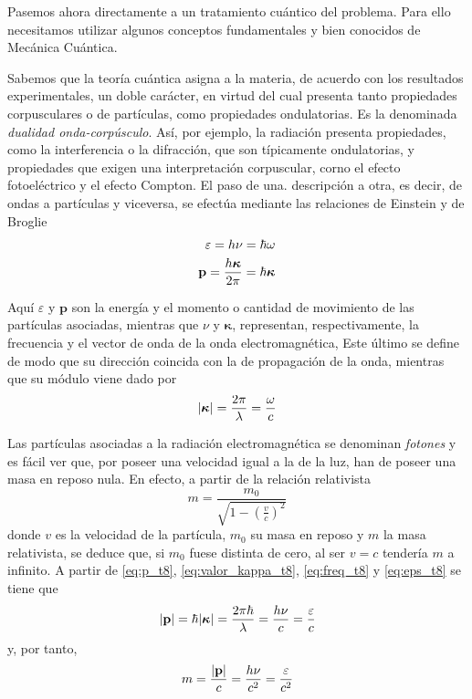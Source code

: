 Pasemos ahora directamente a un tratamiento cuántico del problema.
Para ello necesitamos utilizar algunos conceptos fundamentales y bien conocidos de Mecánica Cuántica.

Sabemos que la teoría cuántica asigna a la materia, de acuerdo con los resultados experimentales, un doble carácter, en virtud del cual presenta tanto propiedades corpusculares o de partículas, como propiedades ondulatorias.
Es la denominada \emph{dualidad onda-corpúsculo}.
Así, por ejemplo, la radiación presenta propiedades, como la interferencia o la difracción, que son típicamente ondulatorias, y propiedades que exigen una interpretación corpuscular, corno el efecto fotoeléctrico y el efecto Compton.
El paso de una. descripción a otra, es decir, de ondas a partículas y viceversa, se efectúa mediante las relaciones de Einstein y de Broglie
\begin{align}
	\varepsilon = h\nu = \hbar\omega \label{eq:eps_t8}\\
	\vb{p} = \frac{h\bm{\kappa}}{2\pi} = \hbar\bm{\kappa} \label{eq:p_t8}
\end{align}

Aquí $\varepsilon$ y $\mathbf{p}$ son la energía y el momento o cantidad de movimiento de las partículas asociadas, mientras que $\nu$ y $\bm{\kappa}$, representan, respectivamente, la frecuencia y el vector de onda de la onda electromagnética, Este último se define de modo que su dirección coincida con la de propagación de la onda, mientras que su módulo viene dado por
\begin{equation}\label{eq:valor_kappa_t8}
	\abs{\bm{\kappa}} = \frac{2\pi}{\lambda} = \frac{\omega}{c}
\end{equation}

Las partículas asociadas a la radiación electromagnética se denominan \emph{fotones} y es fácil ver que, por poseer una velocidad igual a la de la luz, han de poseer una masa en reposo nula.
En efecto, a partir de la relación relativista
\begin{equation}
	m = \frac{m_0}{\sqrt{1 - \left(\frac{v}{c}\right)^2}}
\end{equation}
donde $v$ es la velocidad de la partícula, $m_0$ su masa en reposo y $m$ la masa relativista, se deduce que, si $m_0$ fuese distinta de cero, al ser $v = c$ tendería $m$ a infinito.
A partir de \eqref{eq:p_t8}, \eqref{eq:valor_kappa_t8}, \eqref{eq:freq_t8} y \eqref{eq:eps_t8} se tiene que
\begin{equation}
	\abs{\vb{p}} = \hbar \abs{\bm{\kappa}} = \frac{2\pi \hbar}{\lambda} = \frac{h\nu}{c} = \frac{\varepsilon}{c}
\end{equation}
y, por tanto,
\begin{equation}
	m = \frac{\abs{\vb{p}}}{c} = \frac{h\nu}{c^2} = \frac{\varepsilon}{c^2}
\end{equation}


